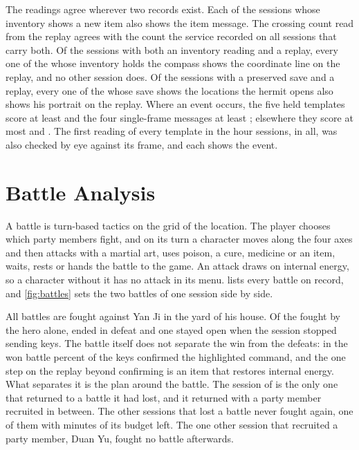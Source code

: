 \documentclass{article} %
\begin{document}
The readings agree wherever two records exist. Each of the \PobtainedBag{} sessions whose inventory shows a new item also shows the item message. The crossing count read from the replay agrees with the count the service recorded on all \LcrossAgree{} sessions that carry both. Of the \PcompassBoth{} sessions with both an inventory reading and a replay, every one of the \PcompassBag{} whose inventory holds the compass shows the coordinate line on the replay, and no other session does. Of the \PhermitBoth{} sessions with a preserved save and a replay, every one of the \PhermitOpened{} whose save shows the locations the hermit opens also shows his portrait on the replay. Where an event occurs, the five held templates score at least \ReplayHitMin{} and the four single-frame messages at least \ReplayMsgHitMin{}; elsewhere they score at most \ReplayMissMax{} and \ReplayMsgMissMax{}. The first reading of every template in the hour sessions, \NpanelAudited{} in all, was also checked by eye against its frame, and each shows the event.

\section{Battle Analysis}
\label{app:battles}
A battle is turn-based tactics on the grid of the location. The player chooses which party members fight, and on its turn a character moves along the four axes and then attacks with a martial art, uses poison, a cure, medicine or an item, waits, rests or hands the battle to the game. An attack draws on internal energy, so a character without it has no attack in its menu.  lists every battle on record, and \cref{fig:battles} sets the two battles of one session side by side.

All \Nbattles{} battles are fought against Yan Ji in the yard of his house. Of the \NbattlesAlone{} fought by the hero alone, \NbattlesAloneLost{} ended in defeat and one stayed open when the session stopped sending keys. The battle itself does not separate the win from the defeats: in the won battle \PwinConfirm{} percent of the keys confirmed the highlighted command, and the one step on the replay beyond confirming is an item that restores internal energy. What separates it is the plan around the battle. The session of \LtopLabel{} is the only one that returned to a battle it had lost, and it returned with a party member recruited in between. The \NlostNoReturn{} other sessions that lost a battle never fought again, one of them with \PnoReturnLeftMin{} minutes of its budget left. The one other session that recruited a party member, Duan Yu, fought no battle afterwards.
\end{document}
